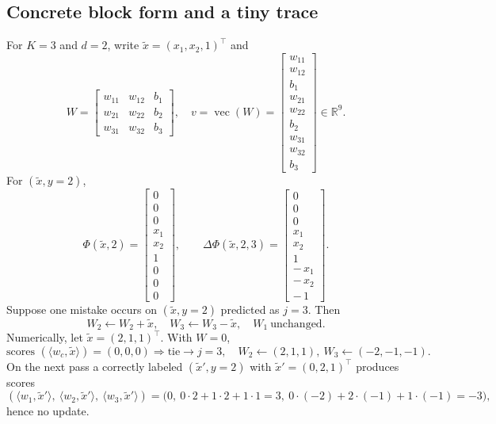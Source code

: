\documentclass[11pt]{article}
\begin{document}
\subsection{Concrete block form and a tiny trace}
For $K=3$ and $d=2$, write $\tilde x=(x_1,x_2,1)^\top$ and
\[
W=
\begin{bmatrix}
w_{11}&w_{12}&b_1\\
w_{21}&w_{22}&b_2\\
w_{31}&w_{32}&b_3
\end{bmatrix},\quad
v=\operatorname{vec}(W)=
\begin{bmatrix}
w_{11}\\w_{12}\\b_1\\
w_{21}\\w_{22}\\b_2\\
w_{31}\\w_{32}\\b_3
\end{bmatrix}\in\mathbb{R}^{9}.
\]
For $(\tilde x,y=2)$,
\[
\Phi(\tilde x,2)=
\begin{bmatrix}
0\\0\\0\\
x_1\\x_2\\1\\
0\\0\\0
\end{bmatrix},\qquad
\Delta\Phi(\tilde x,2,3)=
\begin{bmatrix}
0\\0\\0\\
x_1\\x_2\\1\\
-\,x_1\\-\,x_2\\-\,1
\end{bmatrix}.
\]
Suppose one mistake occurs on $(\tilde x,y=2)$ predicted as $j=3$. Then
\[
W_2\leftarrow W_2+\tilde x,\quad W_3\leftarrow W_3-\tilde x,\quad W_1\ \text{unchanged}.
\]
Numerically, let $\tilde x=(2,1,1)^\top$. With $W=0$,
\[
\text{scores }(\langle w_c,\tilde x\rangle)=(0,0,0)\Rightarrow \text{tie}\to j=3,\quad
W_2\gets (2,1,1),\ W_3\gets (-2,-1,-1).
\]
On the next pass a correctly labeled $(\tilde x',y=2)$ with $\tilde x'=(0,2,1)^\top$ produces scores
\[
(\langle w_1,\tilde x'\rangle,\ \langle w_2,\tilde x'\rangle,\ \langle w_3,\tilde x'\rangle)
=\big(0,\ 0\cdot2+1\cdot2+1\cdot1=3,\ 0\cdot(-2)+2\cdot(-1)+1\cdot(-1)=-3\big),
\]
hence no update.
\end{document}
